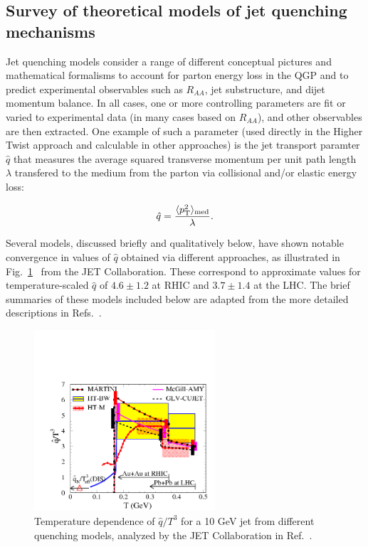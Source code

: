 \subsection{Survey of theoretical models of jet quenching mechanisms}
\label{sec:model_survey}

Jet quenching models consider a range of different conceptual pictures and mathematical formalisms to account for parton energy loss in the QGP and to predict experimental observables such as $R_{AA}$, jet substructure, and dijet momentum balance.  In all cases, one or more controlling parameters are fit or varied to experimental data (in many cases based on $R_{AA}$), and other observables are then extracted.  One example of such a parameter (used directly in the Higher Twist approach and calculable in other approaches) is the jet transport paramter $\hat{q}$ that measures the average squared transverse momentum per unit path length $\lambda$ transfered to the medium from the parton via collisional and/or elastic energy loss:

\begin{equation}
\label{q_hat}
\hat{q}  = \frac{\langle p_{\rm T}^{2}\rangle_{\rm med}}{\lambda}.
\end{equation}

\noindent Several models, discussed briefly and qualitatively below, have shown notable convergence in values of $\hat{q}$ obtained via different approaches, as illustrated in Fig.~\ref{fig:qhat}~\cite{Burke:2013yra} from the JET Collaboration.  These correspond to approximate values for temperature-scaled $\hat{q}$ of $4.6\pm1.2$ at RHIC and $3.7\pm1.4$ at the LHC.  The brief summaries of these models included below are adapted from the more detailed descriptions in Refs.~\cite{Majumder:2010qh, Burke:2013yra, dEnterria:2009am}.


\begin{figure}[ht!]
\begin{center}
\includegraphics[width=0.6\textwidth]{figures/Theory/qhat.png}
\caption[Temperature dependence of $\hat{q}$ from different quenching models]{Temperature dependence of $\hat{q}/T^{3}$ for a 10 GeV jet from different quenching models, analyzed by the JET Collaboration in Ref.~\cite{Burke:2013yra}.}
\label{fig:qhat}
\end{center}
\end{figure}

